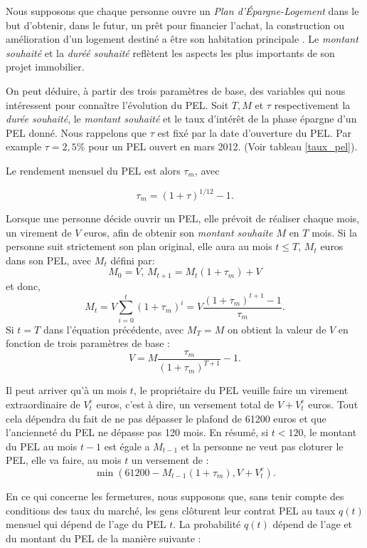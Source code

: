 \documentclass[12pt, a4paper]{book}
\begin{document}
\bigskip

Nous supposons que chaque personne ouvre un {\it Plan d'Épargne-Logement} dans le but d'obtenir, dans le futur, un prêt pour financier l'achat, la construction ou amélioration d'un logement destiné a être son habitation principale .  Le {\it montant souhaité} et la {\it duréé souhaité} reflètent les aspects les plus importants de son projet immobilier.

On peut déduire, à partir des trois paramètres de base, des variables qui nous intéressent pour connaître l'évolution du PEL. Soit $T, M$ et $\tau$ respectivement la {\it durée souhaité}, le {\it montant souhaité} et le taux d'intérêt de la phase épargne d'un PEL donné. Nous rappelons que $\tau$ est fixé par la date d'ouverture du PEL. Par example $\tau = 2,5 \% $ pour un PEL ouvert en mars 2012. (Voir tableau \ref{taux_pel}).

Le rendement mensuel du PEL est alors $\tau_m$, avec

$$ \tau_m = (1+\tau)^{1/12}-1.$$

Lorsque une personne décide ouvrir un PEL, elle prévoit de réaliser chaque mois, un virement de $V$ euros, afin de obtenir son {\it montant souhaite} $M$ en $T$ mois. Si la personne suit strictement son plan original, elle aura au mois $t \leq T$, $M_t$ euros dans son PEL, avec $M_t$ défini par:
$$M_0 = V\mbox{, }M_{t+1} = M_t(1+\tau_m)+V$$
et donc, 
$$ M_t = V\sum_{i=0}^t (1+\tau_m)^i = V \frac{(1+\tau_m)^{t+1}-1}{\tau_m}.$$
Si $t=T$ dans l'équation précédente, avec $M_T=M$ on obtient la valeur de $V$ en fonction de trois paramètres de base :
\begin{equation}
V = M \frac{\tau_m}{(1+\tau_m)^{T+1}}-1.\label{V}
\end{equation}


Il peut arriver qu'à un mois $t$, le propriétaire du PEL  veuille faire un virement extraordinaire de $V_t^e$ euros, c'est à dire, un versement  total de $V+V_t^e$ euros. Tout cela dépendra du fait de ne pas dépasser le plafond de 61200 euros et que l'ancienneté du PEL ne dépasse pas 120 mois. En résumé, si $t<120$, le montant du PEL au mois $t-1$ est égale a $M_{t-1}$ et la personne ne veut pas cloturer le PEL, elle va faire, au mois $t$ un versement de :
$$ \min(61200 - M_{t-1}(1+\tau_m),V+V_t^e).$$ 

En ce qui concerne les fermetures, nous supposons que, sans tenir compte des conditions des taux du marché, les gens clôturent  leur contrat PEL au taux $q(t)$ mensuel qui dépend de l'age du PEL $t$. La probabilité $q(t)$ dépend de l'age et du montant du PEL de la manière suivante :
\end{document}
